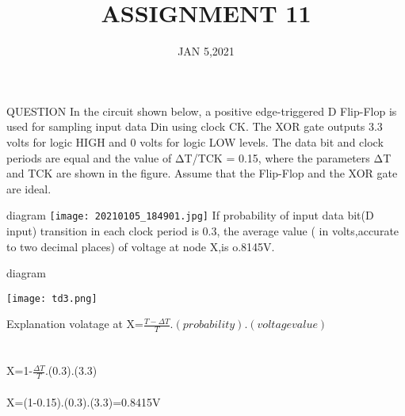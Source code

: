 \documentclass[aspectratio=43]{beamer}
\title{ASSIGNMENT 11} %
\date{JAN 5,2021}
\begin{document}
    
    \frame{\titlepage}
    
    \begin{frame}{QUESTION}
        In the circuit shown below, a positive edge-triggered D Flip-Flop is used for sampling input
data Din using clock CK. The XOR gate outputs 3.3 volts for logic HIGH and 0 volts for
logic LOW levels. The data bit and clock periods are equal and the value of ΔT/TCK = 0.15,
where the parameters ΔT and TCK are shown in the figure. Assume that the Flip-Flop and the
XOR gate are ideal.


    \end{frame}
\begin{frame}{diagram}
\texttt{[image: 20210105\_184901.jpg]}
If probability of input data bit(D input) transition in each clock period is 0.3, the average value ( in volts,accurate to two decimal places)
of voltage at node X,is o.8145V.

    
\end{frame}
    
\begin{frame}{diagram}
\begin{center}
\texttt{[image: td3.png]}
\end{center}
    
\end{frame}
\begin{frame}{Explanation}
    volatage at X=$\frac{T-\Delta T}{T}.(probability).(voltage value)$\\\\\\
    X=1-$\frac{\Delta T}{T}$.(0.3).(3.3)\\\\
    X=(1-0.15).(0.3).(3.3)=0.8415V
\end{frame}
    
    
    
    
\end{document}
